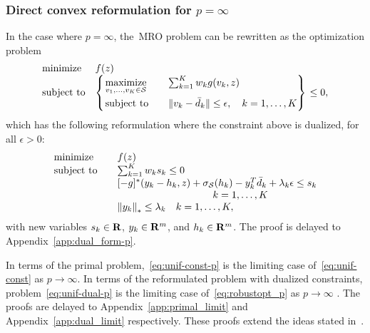 \subsubsection{Direct convex reformulation for $p = \infty$ }
\label{sub:direct-p}
In the case where ${p = \infty}$, the~\gls{MRO} problem can be rewritten as the optimization problem
\begin{equation}
	\label{eq:unif-const-p}
	\begin{array}{ll}
		\mbox{minimize} & f(z)\\
		\mbox{subject to} & \begin{dcases}
			\begin{rcases}
		\underset{v_1, \dots, v_K \in\mathcal{S}}{\text{maximize}} &\quad \sum_{k=1} ^K w_k g(v_k, z) \\
		\mbox{subject to} & \quad  \| v_k - \bar{d}_k \| \le \epsilon, \quad k = 1,\dots, K
			\end{rcases}
			\end{dcases} \le 0,
	\end{array}
\end{equation}
which has the following reformulation where the constraint above is dualized, for all $\epsilon > 0$:
	\begin{equation}
	\label{eq:unif-dual-p}
	\begin{array}{ll}
		\text{minimize} & f(z)\\
 \text{subject to} \quad & \sum_{k=1}^{K} w_k s_k \leq 0\\
&[-g]^*(y_{k} - h_{k},z) + \sigma_{{\supp}}(h_{k}) - y_{k}^T\bar{d}_k  + \lambda_k \epsilon \leq s_k\\
& \hspace{3cm} \quad k = 1,\dots, K\\
&  \left\|y_{k} \right\|_* \leq \lambda_k \quad k = 1,\dots, K,
\end{array}
\end{equation}
with new variables $s_k \in {\mathbf R}$, $y_{k} \in {\mathbf R}^m$, and $h_{k} \in {\mathbf R}^m$. The proof is delayed to Appendix~\ref{app:dual_form-p}.

\begin{remark}[Case ${p = \infty}$ is the limit of case ${p \geq 1}$]
	\label{limit-proof}
	In terms of the primal problem,~\eqref{eq:unif-const-p} is the limiting case of~\eqref{eq:unif-const} as $p \rightarrow \infty$.
	In terms of the reformulated problem with dualized constraints, problem~\eqref{eq:unif-dual-p} is the limiting case of~\eqref{eq:robustopt_p} as $p \rightarrow \infty$ .
	The proofs are delayed to Appendix~\ref{app:primal_limit} and Appendix~\ref{app:dual_limit} respectively. These proofs extend the ideas stated in~\cite[Proposition 3]{wass-p-1}.
\end{remark}

